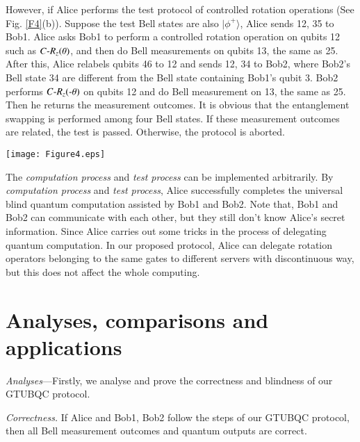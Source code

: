 \documentclass[aps,pra,showpacs,twocolumn,superscriptaddress]{revtex4-1}
\begin{document}
However, if Alice performs the test protocol of controlled rotation operations (See Fig. \ref{F4}(b)). Suppose the test Bell states are also $|\phi^+\rangle$, Alice sends 12, 35 to Bob1. Alice asks Bob1 to perform a controlled rotation operation on qubits 12 such as $C\textnormal{-}R_z(\theta)$, and then do Bell measurements on qubits 13, the same as 25. After this, Alice relabels qubits 46 to 12 and sends 12, 34 to Bob2, where Bob2's Bell state 34 are different from the Bell state containing Bob1's qubit 3. Bob2 performs $C\textnormal{-}R_z(\textnormal{-}\theta)$ on qubits 12 and do Bell measurement on 13, the same as 25. Then he returns the measurement outcomes. It is obvious that the entanglement swapping is performed among four Bell states. If these measurement outcomes are related, the test is passed. Otherwise, the protocol is aborted.
\begin{figure*}[!htp]
  \centering
  \texttt{[image: Figure4.eps]}
  \caption{(Colour online) Schematic diagram of servers' honesty test. \textbf{(a)} When the operation is rotation operation (RO), Bob1 and Bob2 share two Bell states. According to Eq. (6), Bob2 performs related operations (RO') and Bell measurements. \textbf{(b)} When the operation is controlled rotation operation (C\textnormal{-}RO), Bob1 and Bob2 share four Bell states. Bob2 performs related controlled operations ((C\textnormal{-}RO')) and Bell measurement.}\label{F4}
\end{figure*}

The \emph{computation process} and \emph{test process} can be implemented arbitrarily. By \emph{computation process} and \emph{test process}, Alice successfully completes the universal blind quantum computation assisted by Bob1 and Bob2. Note that, Bob1 and Bob2 can communicate with each other, but they still don't know Alice's secret information. Since Alice carries out some tricks in the process of delegating quantum computation. In our proposed protocol, Alice can delegate rotation operators belonging to the same gates to different servers with discontinuous way, but this does not affect the whole computing.

\section{Analyses, comparisons and applications}
\label{sec:ana}
\emph{Analyses}---Firstly, we analyse and prove the correctness and blindness of our GTUBQC protocol.

\emph{Correctness.} If Alice and Bob1, Bob2 follow the steps of our GTUBQC protocol, then all Bell measurement outcomes and quantum outputs are correct.
\end{document}
